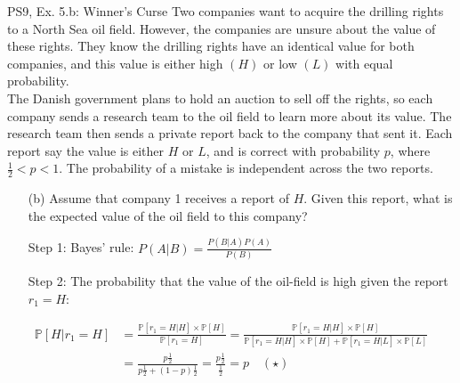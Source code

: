 \begin{frame}{PS9, Ex. 5.b: Winner's Curse}
      Two companies want to acquire the drilling rights to a North Sea oil field. However, the companies are unsure about the value of these rights. They know the drilling rights have an identical value for both companies, and this value is either high $(H)$ or low $(L)$ with equal probability.\\\smallskip
      The Danish government plans to hold an auction to sell off the rights, so each company sends a research team to the oil field to learn more about its value. The research team then sends a private report back to the company that sent it. Each report say the value is either $H$ or $L$, and is correct with probability $p$, where $\frac{1}{2} < p < 1$. The probability of a mistake is independent across the two reports.
      \begin{itemize}
        \item[(b)] Assume that company 1 receives a report of $H$. Given this report, what is the expected value of the oil field to this company?
        \item[Step 1:] Bayes' rule: $P(A|B)=\frac{P(B|A)P(A)}{P(B)}$
        \item[Step 2:] The probability that the value of the oil-field is high given the report $r_1=H$:
      \end{itemize}
      \vspace{-12pt}
      \begin{align*}
        \mathbb{P}[H|r_1=H]
        &=\frac{\mathbb{P}[r_1=H|H]\times\mathbb{P}[H]}{\mathbb{P}[r_1=H]}
        =\frac{\mathbb{P}[r_1=H|H]\times\mathbb{P}[H]}{\mathbb{P}[r_1=H|H]\times\mathbb{P}[H]+\mathbb{P}[r_1=H|L]\times\mathbb{P}[L]}\\
        &=\frac{p\frac{1}{2}}{p\frac{1}{2}+(1-p)\frac{1}{2}}=\frac{p\frac{1}{2}}{\frac{1}{2}}=p\quad (\star)
      \end{align*}
      \vfill\null
\end{frame}
